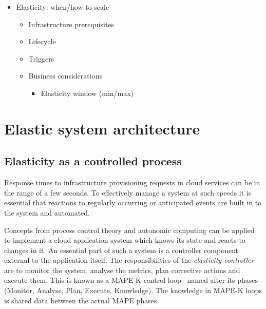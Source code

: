\documentclass[english]{tktltiki2}
\theoremstyle{definition}
\theoremstyle{remark}
\begin{document}

\begin{itemize}
\item Elasticity: when/how to scale
	\begin{itemize}
	\item Infrastructure prerequisites
	\item Lifecycle
	\item Triggers
	\item Business considerations
		\begin{itemize}
		\item Elasticity window (min/max)
		\end{itemize}
	\end{itemize}
\end{itemize}


\section{Elastic system architecture}  
\label{sec:elasticarchitectures}



\subsection{Elasticity as a controlled process}
\label{sec:elasticity_as_a_controlled_process}

Response times to infrastructure provisioning requests in cloud services can be
in the range of a few seconds. To effectively manage a system at such speeds it
is essential that reactions to regularly occurring or anticipated events are
built in to the system and automated.

Concepts from process control theory and autonomic computing can be applied to
implement a cloud application system which knows its state and reacts to changes
in it. An essential part of such a system is a controller component external to
the application itself. The responsibilities of the \emph{elasticity controller}
are to monitor the system, analyse the metrics, plan corrective actions and
execute them. This is known as a MAPE-K control
loop~\cite{Huebscher2008}\cite{Mueller2009} named after its phases (Monitor,
Analyse, Plan, Execute, Knowledge). The knowledge in MAPE-K loops is shared data
between the actual MAPE phases.
\end{document}
